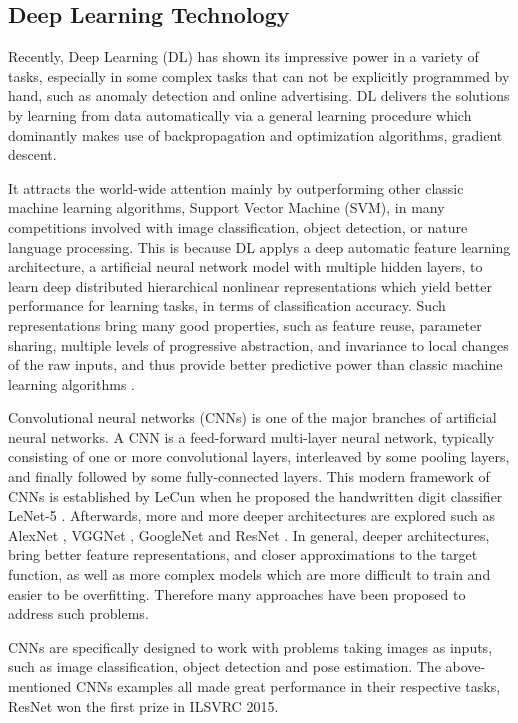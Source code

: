 \subsection{Deep Learning Technology}

Recently, Deep Learning (DL) has shown its impressive power in a variety of tasks, especially in some complex tasks that can not be explicitly programmed by hand, such as anomaly detection and online advertising. DL delivers the solutions by learning from data automatically via a general learning procedure which dominantly makes use of backpropagation and optimization algorithms, \eg gradient descent.

It attracts the world-wide attention mainly by outperforming other classic machine learning algorithms, \eg Support Vector Machine (SVM),  in many competitions  involved with image classification, object detection, or nature language processing. This is because DL applys a deep automatic feature learning architecture, \ie a artificial neural network model with multiple hidden layers, to learn deep distributed hierarchical nonlinear representations which yield better performance for learning tasks, \eg in terms of classification accuracy. Such representations bring many good properties, such as feature reuse, parameter sharing,  multiple levels of progressive abstraction, and invariance to local changes of the raw inputs, and thus provide better predictive power than classic machine learning algorithms \cite{6472238}.

Convolutional neural networks (CNNs) is one of the major branches of artificial neural networks. A CNN is a feed-forward multi-layer neural network, typically consisting of one or more convolutional layers,  interleaved by some pooling layers, and finally followed by some fully-connected layers. This modern framework of CNNs is established by LeCun \etal when he proposed the handwritten digit classifier LeNet-5 \cite{726791}. Afterwards, more and more deeper architectures are explored such as AlexNet \cite{DBLP:Russakovsky14}, VGGNet \cite{DBLP:SimonyanZ14a}, GoogleNet \cite{DBLP:SzegedyLJSRAEVR14} and ResNet \cite{DBLP:HeZRS15}. In general, deeper architectures, bring better feature representations, and closer approximations to the target function, as well as more complex models which are more difficult to train and easier to be overfitting. Therefore many approaches have been proposed to address such problems.

CNNs are specifically designed to work with problems taking images as inputs, such as image classification, object detection and pose estimation. The above-mentioned CNNs examples all made great performance in their respective tasks, \eg ResNet won the first prize in ILSVRC 2015.

